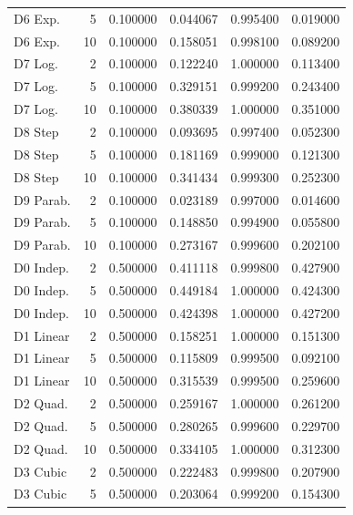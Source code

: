 \begin{tabular}{lrrrrr}
     D6 Exp. &    5 & 0.100000 &    0.044067 &  0.995400 &          0.019000 \\
     D6 Exp. &   10 & 0.100000 &    0.158051 &  0.998100 &          0.089200 \\
     D7 Log. &    2 & 0.100000 &    0.122240 &  1.000000 &          0.113400 \\
     D7 Log. &    5 & 0.100000 &    0.329151 &  0.999200 &          0.243400 \\
     D7 Log. &   10 & 0.100000 &    0.380339 &  1.000000 &          0.351000 \\
     D8 Step &    2 & 0.100000 &    0.093695 &  0.997400 &          0.052300 \\
     D8 Step &    5 & 0.100000 &    0.181169 &  0.999000 &          0.121300 \\
     D8 Step &   10 & 0.100000 &    0.341434 &  0.999300 &          0.252300 \\
   D9 Parab. &    2 & 0.100000 &    0.023189 &  0.997000 &          0.014600 \\
   D9 Parab. &    5 & 0.100000 &    0.148850 &  0.994900 &          0.055800 \\
   D9 Parab. &   10 & 0.100000 &    0.273167 &  0.999600 &          0.202100 \\
   D0 Indep. &    2 & 0.500000 &    0.411118 &  0.999800 &          0.427900 \\
   D0 Indep. &    5 & 0.500000 &    0.449184 &  1.000000 &          0.424300 \\
   D0 Indep. &   10 & 0.500000 &    0.424398 &  1.000000 &          0.427200 \\
   D1 Linear &    2 & 0.500000 &    0.158251 &  1.000000 &          0.151300 \\
   D1 Linear &    5 & 0.500000 &    0.115809 &  0.999500 &          0.092100 \\
   D1 Linear &   10 & 0.500000 &    0.315539 &  0.999500 &          0.259600 \\
    D2 Quad. &    2 & 0.500000 &    0.259167 &  1.000000 &          0.261200 \\
    D2 Quad. &    5 & 0.500000 &    0.280265 &  0.999600 &          0.229700 \\
    D2 Quad. &   10 & 0.500000 &    0.334105 &  1.000000 &          0.312300 \\
    D3 Cubic &    2 & 0.500000 &    0.222483 &  0.999800 &          0.207900 \\
    D3 Cubic &    5 & 0.500000 &    0.203064 &  0.999200 &          0.154300 \\

\end{tabular}
